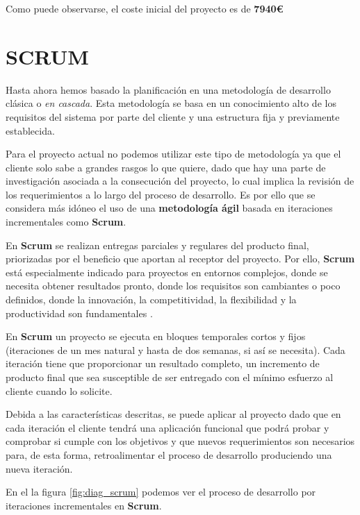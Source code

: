 \bigskip
Como puede observarse, el coste inicial del proyecto es de \textbf{7940\euro}

\section{SCRUM}

Hasta ahora hemos basado la planificación en una metodología de desarrollo clásica o \textit{en cascada}. Esta metodología se basa en un conocimiento alto de los requisitos del sistema por parte del cliente y una estructura fija y previamente establecida. 

\bigskip
Para el proyecto actual no podemos utilizar este tipo de metodología ya que el cliente solo sabe a grandes rasgos lo que quiere, dado que hay una parte de investigación asociada a la consecución del proyecto, lo cual implica la revisión de los requerimientos a lo largo del proceso de desarrollo. Es por ello que se considera más idóneo el uso de una \textbf{metodología ágil} basada en iteraciones incrementales como \textbf{Scrum}.

\bigskip
En \textbf{Scrum} se realizan entregas parciales y regulares del producto final, priorizadas por el beneficio que aportan al receptor del proyecto. Por ello, \textbf{Scrum} está especialmente indicado para proyectos en entornos complejos, donde se necesita obtener resultados pronto, donde los requisitos son cambiantes o poco definidos, donde la innovación, la competitividad, la flexibilidad y la productividad son fundamentales \cite{PASCRUM}.

\bigskip
En \textbf{Scrum} un proyecto se ejecuta en bloques temporales cortos y fijos (iteraciones de un mes natural y hasta de dos semanas, si así se necesita). Cada iteración tiene que proporcionar un resultado completo, un incremento de producto final que sea susceptible de ser entregado con el mínimo esfuerzo al cliente cuando lo solicite.

\bigskip
Debida a las características descritas, se puede aplicar al proyecto dado que en cada iteración el cliente tendrá una aplicación funcional que podrá probar y comprobar si cumple con los objetivos y que nuevos requerimientos son necesarios para, de esta forma, retroalimentar el proceso de desarrollo produciendo una nueva iteración.

\bigskip
En el la figura \ref{fig:diag_scrum} podemos ver el proceso de desarrollo por iteraciones incrementales en \textbf{Scrum}.

